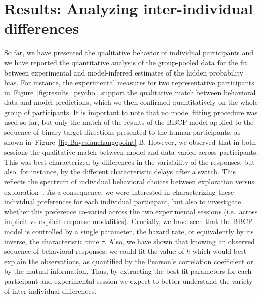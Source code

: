 \documentclass[12pt,english]{article}%
\newcommand{\citep}[1]{\parencite{#1}}
\newcommand{\seeFig}[1]{Figure~\ref{fig:#1}}
\begin{document}
\section{Results: Analyzing inter-individual differences}
\label{sec:inter}
So far, we have presented the qualitative behavior of individual participants and 
we have reported the quantitative analysis of the group-pooled data 
for the fit between experimental and model-inferred estimates of the hidden probability bias.
For instance, the experimental measures for two representative participants in~\seeFig{results_psycho},
support the qualitative match between behavioral data and model predictions,
which we then confirmed quantitatively on the whole group of participants.
It is important to note that no model fitting procedure was used so far,
but only the match of the results of the BBCP-model 
applied to the sequence of binary target directions 
presented to the human participants, 
as shown in~\seeFig{Bayesianchangepoint}-B.
However, we observed that in both sessions the qualitative match between model and data varied across participants.
This was best characterized by differences
in the variability of the responses, but also, for instance,
by the different characteristic delays after a switch.
This reflects the spectrum of individual behavioral choices
between exploration versus exploration~\citep{Behrens07}.
As a consequence, we were interested in characterizing these individual preferences
for each individual participant, 
but also to investigate whether this preference co-varied 
across the two experimental sessions (i.e.~across implicit vs explicit response modalities).
Crucially, we have seen that the BBCP model is controlled by a single parameter,
the hazard rate, or equivalently by its inverse, the characteristic time $\tau$.
Also, we have shown that knowing an observed sequence of behavioral responses,
we could fit the value of $h$ which would best explain the observations,
as quantified by the Pearson's correlation coefficient or by the mutual information.
Thus, by extracting the best-fit parameters for each participant and experimental session
we expect to better understand the variety of inter individual differences. %
\end{document}
